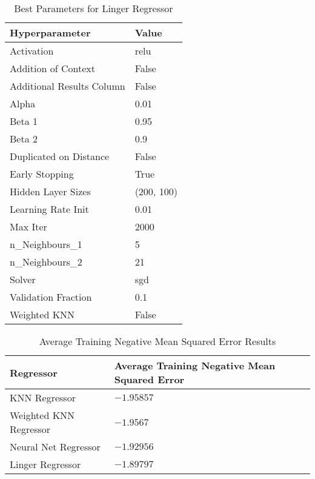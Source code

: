 \documentclass[a4paper, 12pt]{report}
\begin{document}
\begin{table}[H]
    \centering
    \caption{Best Parameters for Linger Regressor}
    \label{tab:best_parameters_linger_regressor_LR_Abalone}
    \begin{tabular}{|l|l|}
    \hline
    \textbf{Hyperparameter} & \textbf{Value} \\ \hline
    Activation & relu \\ \hline
    Addition of Context & False \\ \hline
    Additional Results Column & False \\ \hline
    Alpha & 0.01 \\ \hline
    Beta 1 & 0.95 \\ \hline
    Beta 2 & 0.9 \\ \hline
    Duplicated on Distance & False \\ \hline
    Early Stopping & True \\ \hline
    Hidden Layer Sizes & (200, 100) \\ \hline
    Learning Rate Init & 0.01 \\ \hline
    Max Iter & 2000 \\ \hline
    n\_Neighbours\_1 & 5 \\ \hline
    n\_Neighbours\_2 & 21 \\ \hline
    Solver & sgd \\ \hline
    Validation Fraction & 0.1 \\ \hline
    Weighted KNN & False \\ \hline
    \end{tabular}
\end{table}

\begin{table}[H]
    \centering
    \caption{Average Training Negative Mean Squared Error Results}
    \label{tab:average_results_train_Abalone}
    \begin{tabular}{|l|l|}
    \hline
    \textbf{Regressor} & \textbf{Average Training Negative Mean Squared Error} \\ \hline
    KNN Regressor &  $-1.95857$\\ \hline
    Weighted KNN Regressor &  $-1.9567$\\ \hline
    Neural Net Regressor & $-1.92956$\\ \hline
    Linger Regressor & $-1.89797$\\ \hline
    \end{tabular}
\end{table}
\end{document}
